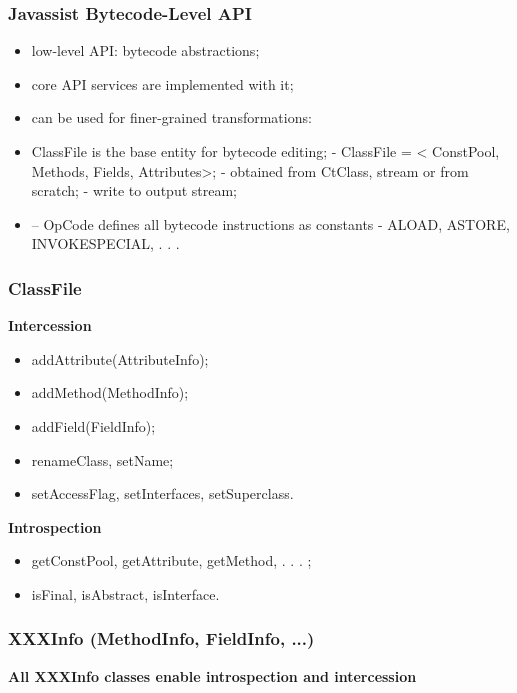 \subsubsection{Javassist Bytecode-Level API}

\begin{itemize}
	\item low-level API: bytecode abstractions;
	\item core API services are implemented with it;
	\item can be used for finer-grained transformations:
	\item ClassFile is the base entity for bytecode editing;
	- ClassFile = < ConstPool, Methods, Fields, Attributes>;
	- obtained from CtClass, stream or from scratch;
	- write to output stream;
	\item – OpCode defines all bytecode instructions as constants
	- ALOAD, ASTORE, INVOKESPECIAL, . . .
\end{itemize}

\subsubsection{ClassFile}

\textbf{Intercession}

\begin{itemize}
	\item addAttribute(AttributeInfo);
	\item addMethod(MethodInfo);
	\item addField(FieldInfo);
	\item renameClass, setName;
	\item setAccessFlag, setInterfaces, setSuperclass.
\end{itemize}

\textbf{Introspection}

\begin{itemize}
	\item getConstPool, getAttribute, getMethod, . . . ;
	\item isFinal, isAbstract, isInterface.
\end{itemize}

\subsubsection{XXXInfo (MethodInfo, FieldInfo, ...)}

\textbf{All XXXInfo classes enable introspection and intercession}

